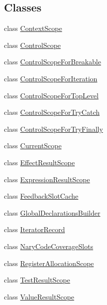 \subsection*{Classes}
\begin{DoxyCompactItemize}
\item 
class \mbox{\hyperlink{classv8_1_1internal_1_1interpreter_1_1BytecodeGenerator_1_1ContextScope}{Context\+Scope}}
\item 
class \mbox{\hyperlink{classv8_1_1internal_1_1interpreter_1_1BytecodeGenerator_1_1ControlScope}{Control\+Scope}}
\item 
class \mbox{\hyperlink{classv8_1_1internal_1_1interpreter_1_1BytecodeGenerator_1_1ControlScopeForBreakable}{Control\+Scope\+For\+Breakable}}
\item 
class \mbox{\hyperlink{classv8_1_1internal_1_1interpreter_1_1BytecodeGenerator_1_1ControlScopeForIteration}{Control\+Scope\+For\+Iteration}}
\item 
class \mbox{\hyperlink{classv8_1_1internal_1_1interpreter_1_1BytecodeGenerator_1_1ControlScopeForTopLevel}{Control\+Scope\+For\+Top\+Level}}
\item 
class \mbox{\hyperlink{classv8_1_1internal_1_1interpreter_1_1BytecodeGenerator_1_1ControlScopeForTryCatch}{Control\+Scope\+For\+Try\+Catch}}
\item 
class \mbox{\hyperlink{classv8_1_1internal_1_1interpreter_1_1BytecodeGenerator_1_1ControlScopeForTryFinally}{Control\+Scope\+For\+Try\+Finally}}
\item 
class \mbox{\hyperlink{classv8_1_1internal_1_1interpreter_1_1BytecodeGenerator_1_1CurrentScope}{Current\+Scope}}
\item 
class \mbox{\hyperlink{classv8_1_1internal_1_1interpreter_1_1BytecodeGenerator_1_1EffectResultScope}{Effect\+Result\+Scope}}
\item 
class \mbox{\hyperlink{classv8_1_1internal_1_1interpreter_1_1BytecodeGenerator_1_1ExpressionResultScope}{Expression\+Result\+Scope}}
\item 
class \mbox{\hyperlink{classv8_1_1internal_1_1interpreter_1_1BytecodeGenerator_1_1FeedbackSlotCache}{Feedback\+Slot\+Cache}}
\item 
class \mbox{\hyperlink{classv8_1_1internal_1_1interpreter_1_1BytecodeGenerator_1_1GlobalDeclarationsBuilder}{Global\+Declarations\+Builder}}
\item 
class \mbox{\hyperlink{classv8_1_1internal_1_1interpreter_1_1BytecodeGenerator_1_1IteratorRecord}{Iterator\+Record}}
\item 
class \mbox{\hyperlink{classv8_1_1internal_1_1interpreter_1_1BytecodeGenerator_1_1NaryCodeCoverageSlots}{Nary\+Code\+Coverage\+Slots}}
\item 
class \mbox{\hyperlink{classv8_1_1internal_1_1interpreter_1_1BytecodeGenerator_1_1RegisterAllocationScope}{Register\+Allocation\+Scope}}
\item 
class \mbox{\hyperlink{classv8_1_1internal_1_1interpreter_1_1BytecodeGenerator_1_1TestResultScope}{Test\+Result\+Scope}}
\item 
class \mbox{\hyperlink{classv8_1_1internal_1_1interpreter_1_1BytecodeGenerator_1_1ValueResultScope}{Value\+Result\+Scope}}
\end{DoxyCompactItemize}
